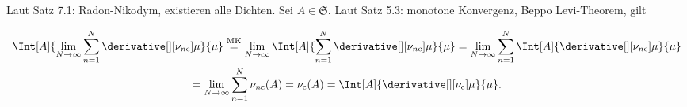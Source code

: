 \begin{solution}
\begin{enumerate}[label = \arabic*.]
    Laut Satz 7.1: Radon-Nikodym, existieren alle Dichten.
    Sei $A \in \mathfrak S$.
    Laut Satz 5.3: monotone Konvergenz, Beppo Levi-Theorem, gilt

    \begin{multline*}
        \Int[A]
        {
            \lim_{N \to \infty}
                \sum_{n=1}^N
                    \derivative[][\nu_{n \mathrm c}]{\mu}
        }{\mu}
        \stackrel
        {
            \text{MK}
        }{=}
        \lim_{N \to \infty}
        \Int[A]
        {
            \sum_{n=1}^N
                \derivative[][\nu_{n \mathrm c}]{\mu}
        }{\mu}
        =
        \lim_{N \to \infty}
            \sum_{n=1}^N
                \Int[A]
                {
                    \derivative[][\nu_{n \mathrm c}]{\mu}
                }{\mu} \\
        =
        \lim_{N \to \infty}
            \sum_{n=1}^N
                \nu_{n \mathrm c}(A)
        =
        \nu_\mathrm{c}(A)
        =
        \Int[A]
        {
            \derivative[][\nu_\mathrm{c}]{\mu}
        }{\mu}.
    \end{multline*}

\end{enumerate}

\end{solution}

